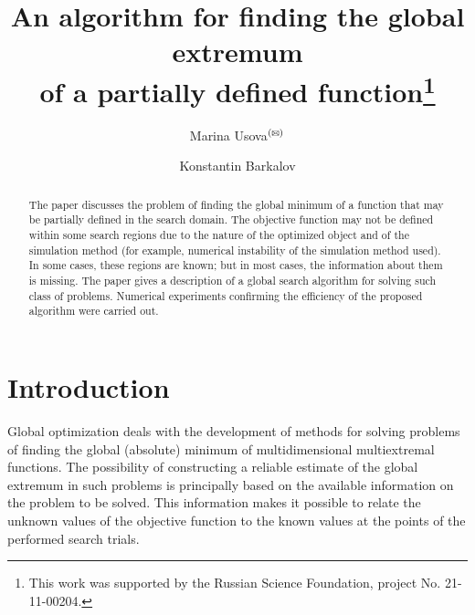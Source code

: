 \documentclass[runningheads]{llncs}
\def\letter{$^{\textrm{(\Letter)}}$}
\begin{document}
%
\title{An algorithm for finding the global extremum\\ 
of a partially defined function\thanks{This work was supported by the Russian Science Foundation, project No. 21-11-00204.}}
%
%
\author{Marina Usova\letter{} \and
Konstantin Barkalov}
%
%
%
\maketitle              %
%
\begin{abstract}
The paper discusses the problem of finding the global minimum of a function that may be partially defined in the search domain. The objective function may not be defined within some search regions due to the nature of the optimized object and of the simulation method (for example, numerical instability of the simulation method used). In some cases, these regions are known; but in most cases, the information about them is missing. The paper gives a description of a global search algorithm for solving such class of problems. Numerical experiments confirming the efficiency of the proposed algorithm were carried out.

\end{abstract}
%
%
%
\section{Introduction}

Global optimization deals with the development of methods for solving problems of finding the global (absolute) minimum of multidimensional multiextremal functions. The possibility of constructing a reliable estimate of the global extremum in such problems is principally based on the available information on the problem to be solved. This information makes it possible to relate the unknown values of the objective function to the known values at the points of the performed search trials.
\end{document}
